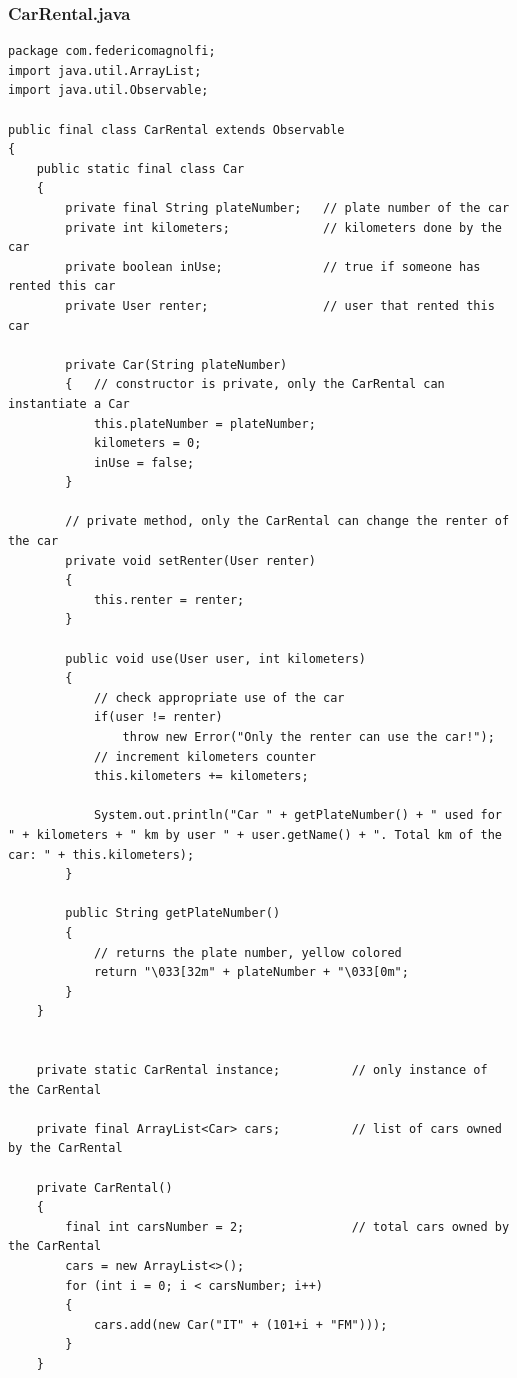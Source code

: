 \documentclass[]{article}
\begin{document}
\subsubsection*{CarRental.java}
\begin{lstlisting}
package com.federicomagnolfi;
import java.util.ArrayList;
import java.util.Observable;

public final class CarRental extends Observable
{
    public static final class Car
    {
        private final String plateNumber;   // plate number of the car
        private int kilometers;             // kilometers done by the car
        private boolean inUse;              // true if someone has rented this car
        private User renter;                // user that rented this car

        private Car(String plateNumber)
        {   // constructor is private, only the CarRental can instantiate a Car
            this.plateNumber = plateNumber;
            kilometers = 0;
            inUse = false;
        }

        // private method, only the CarRental can change the renter of the car
        private void setRenter(User renter)
        {
            this.renter = renter;
        }

        public void use(User user, int kilometers)
        {
            // check appropriate use of the car
            if(user != renter)
                throw new Error("Only the renter can use the car!");
            // increment kilometers counter
            this.kilometers += kilometers;

            System.out.println("Car " + getPlateNumber() + " used for " + kilometers + " km by user " + user.getName() + ". Total km of the car: " + this.kilometers);
        }

        public String getPlateNumber()
        {
            // returns the plate number, yellow colored
            return "\033[32m" + plateNumber + "\033[0m";
        }
    }


    private static CarRental instance;          // only instance of the CarRental

    private final ArrayList<Car> cars;          // list of cars owned by the CarRental

    private CarRental()
    {
        final int carsNumber = 2;               // total cars owned by the CarRental
        cars = new ArrayList<>();
        for (int i = 0; i < carsNumber; i++)
        {
            cars.add(new Car("IT" + (101+i + "FM")));
        }
    }


\end{lstlisting}
\end{document}
